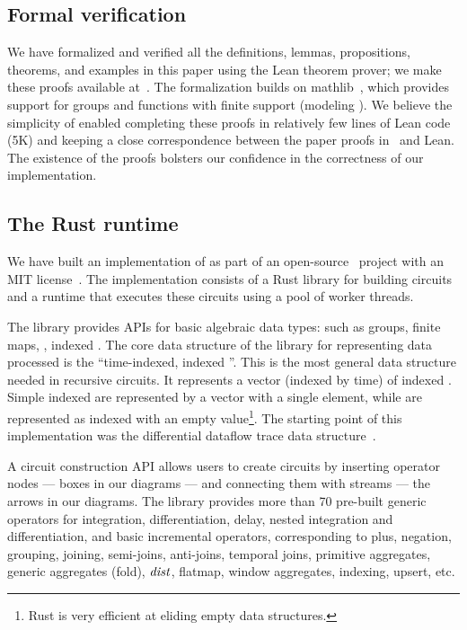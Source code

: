 \subsection{Formal verification}

We have formalized and verified all the definitions, lemmas,
propositions, theorems, and examples in this paper using the Lean
theorem prover; we make these proofs available at~\cite{dbsp-theory}.
The formalization builds on mathlib~\cite{mathlib2020}, which provides
support for groups and functions with finite support (modeling
\zrs). We believe the simplicity of \dbsp enabled completing these
proofs in relatively few lines of Lean code (5K) and keeping a close
correspondence between the paper proofs in~\cite{tr} and Lean.  The
existence of the proofs bolsters our confidence in the correctness of
our implementation.

\subsection{The \dbsp Rust runtime}\label{sec:runtime}

We have built an implementation of \dbsp as part of an
open-source~\cite{dbsp-repo} project with an MIT
license~\cite{dbsp-crate}.  The implementation consists of a Rust
library for building circuits and a runtime that executes these
circuits using a pool of worker threads.

The library provides APIs for basic algebraic data types: such as
groups, finite maps, \zrs, indexed \zrs.  The core data structure of
the library for representing data processed is the ``time-indexed,
indexed \zr''.  This is the most general data structure needed in
recursive circuits.  It represents a vector (indexed by time) of
indexed \zrs.  Simple indexed \zrs are represented by a vector with a
single element, while \zrs are represented as indexed \zrs with an
empty value\footnote{Rust is very efficient at eliding empty data
structures.}.  The starting point of this implementation was the
differential dataflow trace data structure~\cite{dd-crate}.

A circuit construction API allows users to create \dbsp circuits by
inserting operator nodes --- boxes in our diagrams --- and connecting
them with streams --- the arrows in our diagrams.  The library
provides more than 70 pre-built generic operators for integration,
differentiation, delay, nested integration and differentiation, and
basic \zr incremental operators, corresponding to plus, negation,
grouping, joining, semi-joins, anti-joins, temporal joins, primitive
aggregates, generic aggregates (fold), $\mathit{dist}$, flatmap, window
aggregates, indexing, upsert, etc.

